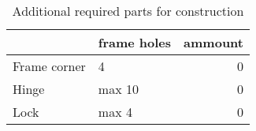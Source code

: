 \begin{table}[h!]
\centering
\caption{Additional required parts for construction}
\begin{tabular}{llr}
\toprule
{} & frame holes &  ammount \\
\midrule
Frame corner &           4 &        0 \\
Hinge        &      max 10 &        0 \\
Lock         &       max 4 &        0 \\
\bottomrule
\end{tabular}
\end{table}
